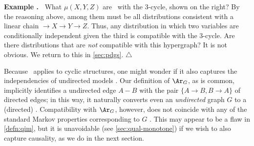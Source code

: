 \newlength{\cycleboxlen}
\newsavebox\cyclebox
\sbox{}
\settowidth{\cycleboxlen}{\usebox{\cyclebox}}
\addtolength{\cycleboxlen}{1em}
\begin{wrapfigure}[4]{o}{\cycleboxlen}
    \vspace{-0.8em}
    \hfill
    \usebox\cyclebox
\end{wrapfigure}
\label{example:xyz-cycle-1}
\textbf{Example {\theexample}.~} 
    What $\mu(X,Y,Z)$ are \cible\ with the 3-cycle, shown on the right?
    By the reasoning above,
     among them must be all distributions consistent with a linear chain ${\to}X{\to}Y{\to}Z$. Thus,  
    any distribution in which two variables are conditionally independent given the third is compatible with the 3-cycle.
    Are there
    distributions that are \emph{not} compatible with 
    this hypergraph? It is not obvious. We return to this
     in \cref{sec:pdgs}. 
\hfill$\triangle$



Because \scibility\ applies to cyclic structures,  one might wonder if
    it also captures the independencies of undirected models 
    \unskip.
Our definition of $\Ar_G$, as is common, implicitly identifies a undirected edge $A {-} B$ with the pair $\{ A{\to}B, B{\to}A\}$ of directed edges;
in this way, it naturally converts even an \emph{undirected} graph $G$ to a (directed) \hgraph. 
Compatibility with $\Ar_G$, however, does not coincide with any of the standard Markov properties
corresponding to $G$ \citep{KF09}.
This may appear to be a flaw in \cref{defn:qim},
but it is unavoidable (see \cref{sec:qual-monotone}) if we wish to also capture causality, as we do in the next section. 


